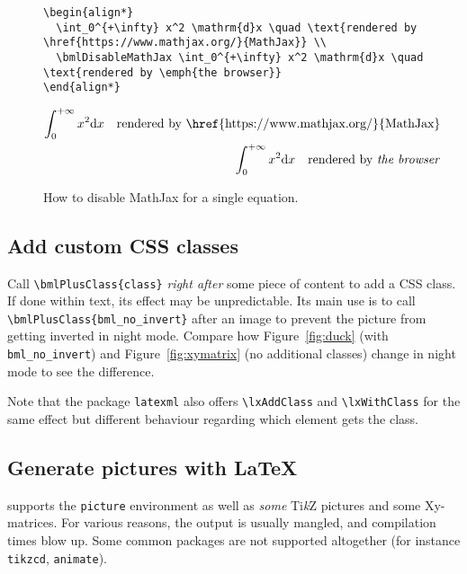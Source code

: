 \documentclass[a4paper,british]{article}
\def\Xy{Xy}
\def\tikzname{Ti\emph{k}Z}
\def\ltxinline{\lstinline[style=bookml]}
\begin{document}
\begin{figure}
  \begin{lstlisting}[style=bookml]
\begin{align*}
  \int_0^{+\infty} x^2 \mathrm{d}x \quad \text{rendered by \href{https://www.mathjax.org/}{MathJax}} \\
  \bmlDisableMathJax \int_0^{+\infty} x^2 \mathrm{d}x \quad \text{rendered by \emph{the browser}}
\end{align*}
  \end{lstlisting}
  \begin{align*}
    \int_0^{+\infty} x^2 \mathrm{d}x \quad \text{rendered by \href{https://www.mathjax.org/}{MathJax}} \\
    \bmlDisableMathJax \int_0^{+\infty} x^2 \mathrm{d}x \quad \text{rendered by \emph{the browser}}
  \end{align*}
  \caption{How to disable MathJax for a single equation.}
  \label{fig:disable-mathjax}
\end{figure}

\subsection{Add custom CSS classes}
Call \ltxinline|\bmlPlusClass{class}| \emph{right after} some piece of content to add a CSS class. If done within text, its effect may be unpredictable. Its main use is to call \ltxinline|\bmlPlusClass{bml_no_invert}| after an image to prevent the picture from getting inverted in night mode. Compare how Figure~\ref{fig:duck} (with \ltxinline|bml_no_invert|) and Figure~\ref{fig:xymatrix} (no additional classes) change in night mode to see the difference.

Note that the package \ltxinline|latexml| also offers \ltxinline|\lxAddClass| and \ltxinline|\lxWithClass| for the same effect but different behaviour regarding which element gets the class.

\subsection{Generate pictures with \LaTeX{}}
\label{sec:external-image}

\LaTeXML{} supports the \ltxinline|picture| environment as well as \emph{some} \tikzname{} pictures and some \Xy-matrices. For various reasons, the output is usually mangled, and compilation times blow up. Some common packages are not supported altogether (for instance \ltxinline|tikzcd|, \ltxinline|animate|).
\end{document}

